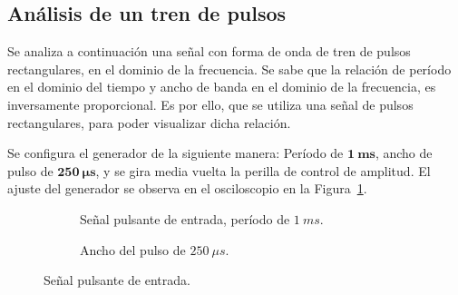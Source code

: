   \subsection{Análisis de un tren de pulsos}

    Se analiza a continuación una señal con forma de onda de tren de pulsos rectangulares, en el dominio 
    de la frecuencia.
    Se sabe que la relación de período en el dominio del tiempo y ancho de banda en el dominio de la frecuencia, 
    es inversamente proporcional. Es por ello, que se utiliza una señal de pulsos rectangulares, para poder visualizar 
    dicha relación.

    Se configura el generador de la siguiente manera: Período de $\mathbf{1~ms}$, ancho de pulso de 
    $\mathbf{250~\mu s}$, y se gira media vuelta la perilla de control de amplitud. El ajuste del 
    generador se observa en el osciloscopio en la Figura~\ref{fig:Exp2SeñalPulso}.

        \begin{figure}[H]
        \centering
        \begin{subfigure}[H]{0.48\textwidth}
          \caption{Señal pulsante de entrada, período de $1~ms$.}
        \end{subfigure}
        \hfill
        \begin{subfigure}[H]{0.48\textwidth}
          \caption{Ancho del pulso de $250~\mu s$.}
        \end{subfigure}

        \caption{Señal pulsante de entrada.}
        \label{fig:Exp2SeñalPulso}
      \end{figure}

